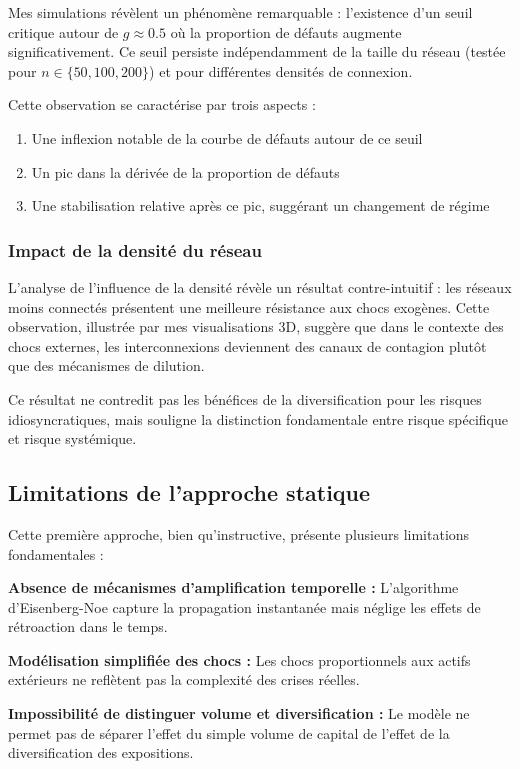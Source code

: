 \documentclass[12pt,a4paper,twoside]{article}
\begin{document}
Mes simulations révèlent un phénomène remarquable : l'existence d'un seuil critique autour de $g \approx 0.5$ où la proportion de défauts augmente significativement. Ce seuil persiste indépendamment de la taille du réseau (testée pour $n \in \{50, 100, 200\}$) et pour différentes densités de connexion.

Cette observation se caractérise par trois aspects :
\begin{enumerate}
\item Une inflexion notable de la courbe de défauts autour de ce seuil
\item Un pic dans la dérivée de la proportion de défauts
\item Une stabilisation relative après ce pic, suggérant un changement de régime
\end{enumerate}

\subsubsection{Impact de la densité du réseau}

L'analyse de l'influence de la densité révèle un résultat contre-intuitif : les réseaux moins connectés présentent une meilleure résistance aux chocs exogènes. Cette observation, illustrée par mes visualisations 3D, suggère que dans le contexte des chocs externes, les interconnexions deviennent des canaux de contagion plutôt que des mécanismes de dilution.

Ce résultat ne contredit pas les bénéfices de la diversification pour les risques idiosyncratiques, mais souligne la distinction fondamentale entre risque spécifique et risque systémique.

\subsection{Limitations de l'approche statique}

Cette première approche, bien qu'instructive, présente plusieurs limitations fondamentales :

\textbf{Absence de mécanismes d'amplification temporelle :} L'algorithme d'Eisenberg-Noe capture la propagation instantanée mais néglige les effets de rétroaction dans le temps.

\textbf{Modélisation simplifiée des chocs :} Les chocs proportionnels aux actifs extérieurs ne reflètent pas la complexité des crises réelles.

\textbf{Impossibilité de distinguer volume et diversification :} Le modèle ne permet pas de séparer l'effet du simple volume de capital de l'effet de la diversification des expositions.
\end{document}
